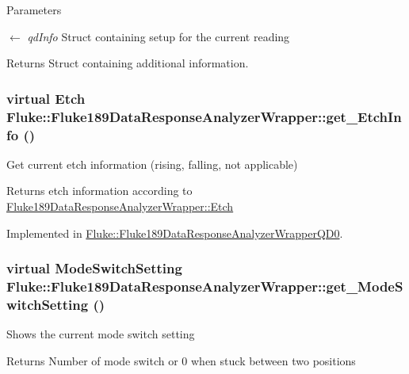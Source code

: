 \begin{DoxyParams}{Parameters}
\item[\mbox{$\leftarrow$} {\em qdInfo}]Struct containing setup for the current reading \end{DoxyParams}
\begin{DoxyReturn}{Returns}
Struct containing additional information. 
\end{DoxyReturn}
\hypertarget{classFluke_1_1Fluke189DataResponseAnalyzerWrapper_a258e56c1ff27b8aae648940599d3b475}{
\subsubsection[{get\_\-EtchInfo}]{\setlength{\rightskip}{0pt plus 5cm}virtual {\bf Etch} Fluke::Fluke189DataResponseAnalyzerWrapper::get\_\-EtchInfo ()}}
\label{classFluke_1_1Fluke189DataResponseAnalyzerWrapper_a258e56c1ff27b8aae648940599d3b475}
Get current etch information (rising, falling, not applicable) \begin{DoxyReturn}{Returns}
etch information according to \hyperlink{classFluke_1_1Fluke189DataResponseAnalyzerWrapper_ada71f6ab32a7b0eb40bb0ed96d7053bc}{Fluke189DataResponseAnalyzerWrapper::Etch} 
\end{DoxyReturn}


Implemented in \hyperlink{classFluke_1_1Fluke189DataResponseAnalyzerWrapperQD0_a8a50c55ebd21461e4c934a1eb4b07641}{Fluke::Fluke189DataResponseAnalyzerWrapperQD0}.\hypertarget{classFluke_1_1Fluke189DataResponseAnalyzerWrapper_a18e1b686e50a4cc3a7023c646f66a35c}{
\subsubsection[{get\_\-ModeSwitchSetting}]{\setlength{\rightskip}{0pt plus 5cm}virtual {\bf ModeSwitchSetting} Fluke::Fluke189DataResponseAnalyzerWrapper::get\_\-ModeSwitchSetting ()}}
\label{classFluke_1_1Fluke189DataResponseAnalyzerWrapper_a18e1b686e50a4cc3a7023c646f66a35c}
Shows the current mode switch setting \begin{DoxyReturn}{Returns}
Number of mode switch or 0 when stuck between two positions 
\end{DoxyReturn}


